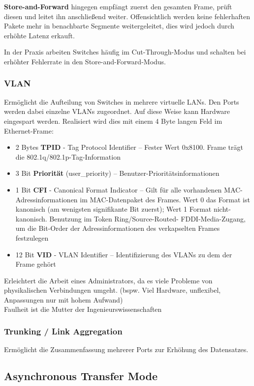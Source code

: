 \documentclass{article} %
\begin{document}
\textbf{Store-and-Forward} hingegen empfängt zuerst den gesamten Frame, prüft diesen und leitet ihn anschließend weiter.
Offensichtlich werden keine fehlerhaften Pakete mehr in benachbarte Segmente weitergeleitet, dies wird jedoch durch erhöhte Latenz erkauft.

In der Praxis arbeiten Switches häufig im Cut-Through-Modus und schalten bei erhöhter Fehlerrate in den Store-and-Forward-Modus.

\subsubsection{VLAN}

Ermöglicht die Aufteilung von Switches in mehrere virtuelle LANs.
Den Ports werden dabei einzelne VLANs zugeordnet.
Auf diese Weise kann Hardware eingespart werden.
Realisiert wird dies mit einem 4 Byte langen Feld im Ethernet-Frame:
\begin{itemize}
	\item 2 Bytes \textbf{TPID} - Tag Protocol Identifier – Fester Wert 0x8100. Frame
	trägt die 802.1q/802.1p-Tag-Information
	\item 3 Bit \textbf{Priorität} (user\_priority) – Benutzer-Prioritätsinformationen
	\item 1 Bit \textbf{CFI} - Canonical Format Indicator – Gilt für alle vorhandenen
MAC-Adressinformationen im MAC-Datenpaket des Frames. Wert 0
das Format ist kanonisch (am wenigsten signifikante Bit zuerst); Wert
1 Format nicht-kanonisch. Benutzung im Token Ring/Source-Routed-
FDDI-Media-Zugang, um die Bit-Order der Adressinformationen des
verkapselten Frames festzulegen
	\item 12 Bit \textbf{VID} - VLAN Identifier – Identifizierung des VLANs zu dem der
Frame gehört
\end{itemize}
Erleichtert die Arbeit eines Administrators, da es viele Probleme von physikalischen Verbindungen umgeht. (bspw. Viel Hardware, unflexibel, Anpassungen nur mit hohem Aufwand)\\


\glqq Faulheit ist die Mutter der Ingenieurswissenschaften\grqq\\
\subsubsection{Trunking / Link Aggregation}
Ermöglicht die Zusammenfassung mehrerer Ports zur Erhöhung des Datensatzes.

\subsection{Asynchronous Transfer Mode}
\end{document}
